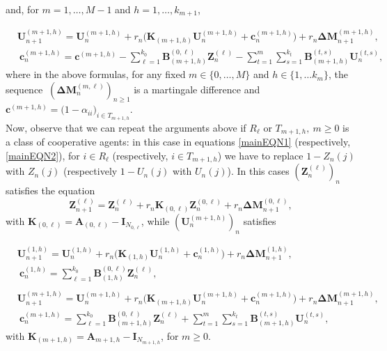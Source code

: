 \documentclass[article,12pt]{article}
\theoremstyle{plain}
\theoremstyle{definition}
\theoremstyle{remark}
\numberwithin{equation}{section}
\numberwithin{theorem}{section}
\begin{document}
		and, for  $m=1,\ldots ,M-1$ and $h=1,\ldots, k_{m+1}$,  
		
		\begin{align}\label{EQNm}
			&\mathbf{U}^{(m+1, h)}_{n+1}=\mathbf{U}^{(m+1, h)}_n +r_n \big(\mathbf{K}_{(m+1, h)} \mathbf{U}^{(m+1, h)}_n + \mathbf{c}^{(m+1, h)}_n\big)+ r_n \mathbf{\Delta M}^{{(m+1, h)}}_{n+1},\\
			&\ \mathbf{c}^{(m+1, h)}_n=\mathbf{c}^{(m+1, h)}- \sum_{\ell=1}^{k_0} \mathbf{B}_{(m+1, h)}^{(0, \ell)}\mathbf{Z}^{(\ell)}_n -\sum_{t=1}^m \sum_{s=1}^{k_t} \mathbf{B}_{(m+1, h)}^{(t, s)} \mathbf{U}^{(t, s)}_n \nonumber,
		\end{align} 
		where in the above formulas, for any fixed $m\in \{0,\ldots, M\}$ and $h\in\{1,\ldots k_m\}$, the sequence $\ (\mathbf{\Delta M}^{(m,\ell)}_{n})_{n\geq 1}$
		is a martingale difference and $\mathbf{c}^{(m+1, h)}=\big(1-\alpha_{ii})_{i\in T_{m+1, h}}$.\\
		
		Now, observe that we can repeat the arguments above if $R_{\ell}$ or $T_{m+1, h},\ m\geq 0$ is a class of cooperative agents: in this case in equations \eqref{mainEQN1} (respectively, \eqref{mainEQN2}), for $i\in R_{\ell}$ (respectively, $i\in T_{m+1, h}$) we have to replace $1-Z_n(j)$ with $Z_n(j)$ (respectively $1-U_n(j)$ with $U_n(j)$). In this cases $(\mathbf{Z}^{(\ell)}_n)_n$ satisfies the equation 
		\begin{equation}\label{EQNCooperativeZ}
			\mathbf{Z}^{(\ell)}_{n+1}=\mathbf{Z}^{(\ell)}_n +r_n \mathbf{K}_{(0,\ell)} \mathbf{Z}^{(0,\ell)}_n+ r_n \mathbf{\Delta M}^{{(0, \ell)}}_{n+1},
		\end{equation} 
		with $\mathbf{K}_{(0,\ell)}=\mathbf{A}_{(0,\ell)}-\mathbf{I}_{N_{0,\ell}}$, while  $(\mathbf{U}^{(m+1, h)}_n)_n$ satisfies  
		
		\begin{align}
			& \mathbf{U}^{(1,h)}_{n+1}=\mathbf{U}^{(1,h)}_n +r_n\big( \mathbf{K}_{(1,h)}\mathbf{U}^{(1,h)}_n+\mathbf{c}^{(1,h)}_n\big)+ r_n\mathbf{\Delta M}^{(1,h)}_{n+1},\label{EQNmcooperative1}\\
			&\ \mathbf{c}^{(1, h)}_n= \sum_{\ell=1}^{k_0} \mathbf{B}_{(1, h)}^{(0,\ell)}\mathbf{Z}^{(\ell)}_n,\nonumber\\
			&\nonumber\\ 
			&\mathbf{U}^{(m+1, h)}_{n+1}=\mathbf{U}^{(m+1, h)}_n +r_n \big(\mathbf{K}_{(m+1, h)} \mathbf{U}^{(m+1, h)}_n + \mathbf{c}^{(m+1, h)}_n\big)+ r_n \mathbf{\Delta M}^{{(m+1, h)}}_{n+1}, \label{EQNmcooperative}\\
			&\ \mathbf{c}^{(m+1, h)}_n=\sum_{\ell=1}^{k_0} \mathbf{B}_{(m+1, h)}^{(0, \ell)}\mathbf{Z}^{(\ell)}_n +\sum_{t=1}^m \sum_{s=1}^{k_t} \mathbf{B}_{(m+1, h)}^{(t, s)} \mathbf{U}^{(t, s)}_n, \nonumber
		\end{align} 
		with $\mathbf{K}_{(m+1, h)}=\mathbf{A}_{m+1, h}-\mathbf{I}_{N_{m+1,h}}$, for $m\geq 0$. \\
		
\end{document}
